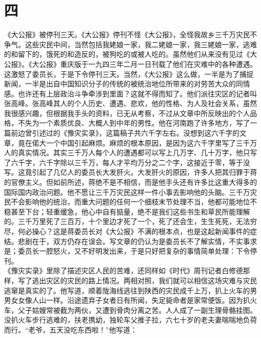 \fancyhead[RO]{\thepage} %
\fancyhead[LE]{\thepage} %
\fancyfoot[LE,RO]{}
\fancyfoot[LO,CE]{}
\fancyfoot[CO,RE]{}
\chapter*{四}
《大公报》被停刊三天。《大公报》停刊不怪《大公报》，全怪我故乡三千万灾民不争气。这些灾民中间，当然包括我姥娘一家，我二姥娘一家，我三姥娘一家，逃难的和留下的，饿死的和造反的，被狗吃的或被人吃的。虽然他们从来没有见过《大公报》。《大公报》重庆版于一九四三年二月一日刊载了他们在灾难中的各种遭遇。这激怒了委员长，于是下令停刊三天。当然，《大公报》这么做，一半是为了捕捉新闻，一半是出自中国知识分子的传统的被统治地位所带来的对劳苦大众的同情感。也许还有上层政治斗争牵涉到里面？这就不得而知了。他们派往灾区的记者叫张高峰。张高峰其人的个人历史、遭遇、悲欢，他的性格、为人及社会关系，虽然我很感兴趣，但根据我手头的资料，已无从考察，不过从文章中所反映出的个人品格，不失为一个素质优良、大概人到中年的男性。他在河南跑了许多地方，写了一篇前边曾引述过的《豫灾实录》，这篇稿子共六千字左右。没想到这六千字的文章，竟在偌大一个中国引起麻烦。麻烦的根本原因，是因为这六千字里写了三千万人的真实情况。其实三千万人每个人的遭遇都可以写上几万字、几十万字，他只写了六千字，六千字除以三千万，每人才平均万分之二个字，这接近于零，等于没写。这竟引起了几亿人的委员长大发肝火。大发肝火的原因，许多人把其归罪于蒋的官僚主义。但如前所述，蒋绝不是不相信，而是他手头还有许多比这重大得多的国际国内政治问题。他不愿让三千万灾民这样一件小事去影响他的头脑。三千万灾民不会影响他的统治，而重大问题的任何一个细枝末节处理不当，他都可能地位不稳甚至下台；轻重缓急，他心中自有掂量，绝不是我们这些书生和草民所能理解的。三千万里死了三百万，十个里边才死了一个，死了还会生，生生死死，无法穷尽，何必操心？这是蒋委员长对《大公报》不满的根本点，也是这起新闻事件的症结。悲剧在于，双方仍存在误会。写文章的仍认为是委员长不了解实情，不实事求是；委员长一腔怒火，又不好明发出来，于是只好把复杂的事情简单处理：下令停刊。\\

《豫灾实录》里除了描述灾区人民的苦难，还同样如《时代》周刊记者白修德那样，写了逃出灾区的灾民的路上情况。两相对照，我们就可以相信这场灾难与灾民逃窜是真实的了。他写道，顺着陇海线逃往到陕西的灾民成千上万，扒上火车的男男女女像人山一样。沿途遗弃子女者日有所闻，失足毙命者是家常便饭。因为扒火车，父子姑嫂常被截为两伙，又遭到骨肉分离之苦。人人成了一副生理骨骼挂图。没扒火车步行逃难的，扶老携幼，独轮车父推子拉，六七十岁的老夫妻喘喘地负荷而行。“老爷，五天没吃东西啦！”他写道：\\

